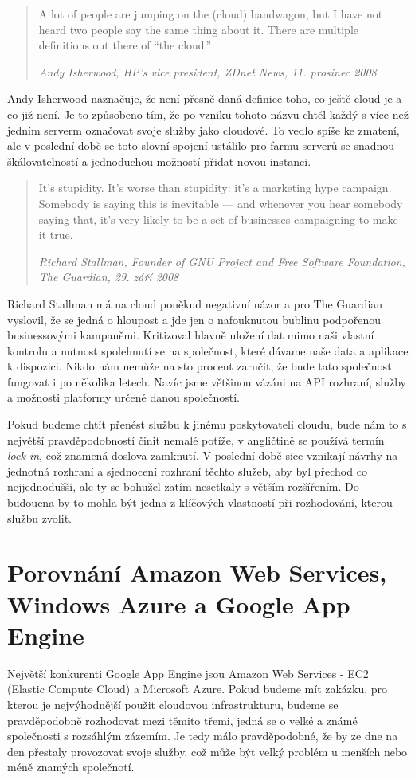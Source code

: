 \begin{quotation}
A lot of people are jumping on the (cloud) bandwagon, but I have not heard two people say the same thing about it. There are multiple definitions out there of “the cloud.”

\em Andy Isherwood, HP’s vice president, ZDnet News, 11. prosinec 2008
\end{quotation}

Andy Isherwood naznačuje, že není přesně daná definice toho, co ještě cloud je a co již není. Je to způsobeno tím, že po vzniku tohoto názvu chtěl každý s více než jedním serverm označovat svoje služby jako cloudové. To vedlo spíše ke zmatení, ale v poslední době se toto slovní spojení ustálilo pro farmu serverů se snadnou škálovatelností a jednoduchou možností přidat novou instanci.

\begin{quotation}
It’s stupidity. It’s worse than stupidity: it’s a marketing hype campaign. Somebody is saying this is inevitable — and whenever you hear somebody saying that, it’s very likely to be a set of businesses campaigning to make it true.

\em Richard Stallman, Founder of GNU Project and Free Software Foundation, The Guardian, 29. září 2008
\end{quotation}

Richard Stallman má na cloud poněkud negativní názor a pro The Guardian vyslovil, že se jedná o hloupost a jde jen o nafouknutou bublinu podpořenou businessovými kampaněmi. Kritizoval hlavně uložení dat mimo naši vlastní kontrolu a nutnost spolehnutí se na společnost, které dávame naše data a aplikace k dispozici. Nikdo nám nemůže na sto procent zaručit, že bude tato společnost fungovat i po několika letech. Navíc jsme většinou vázáni na API rozhraní, služby a možnosti platformy určené danou společností.

Pokud budeme chtít přenést službu k jinému poskytovateli cloudu, bude nám to s největší pravděpodobností činit nemalé potíže, v angličtině se používá termín \emph{lock-in}, což znamená doslova zamknutí. V poslední době sice vznikají návrhy na jednotná rozhraní a sjednocení rozhraní těchto služeb, aby byl přechod co nejjednodušší, ale ty se bohužel zatím nesetkaly s větším rozšířením. Do budoucna by to mohla být jedna z klíčových vlastností při rozhodování, kterou službu zvolit.

\section{Porovnání Amazon Web Services, Windows Azure a Google App Engine}
Největší konkurenti Google App Engine jsou Amazon Web Services - EC2 (Elastic Compute Cloud) a Microsoft Azure. Pokud budeme mít zakázku, pro kterou je nejvýhodnější použit cloudovou infrastrukturu, budeme se pravděpodobně rozhodovat mezi těmito třemi, jedná se o velké a známé společnosti s rozsáhlým zázemím. Je tedy málo pravděpodobné, že by ze dne na den přestaly provozovat svoje služby, což může být velký problém u menších nebo méně znamých společnotí.

